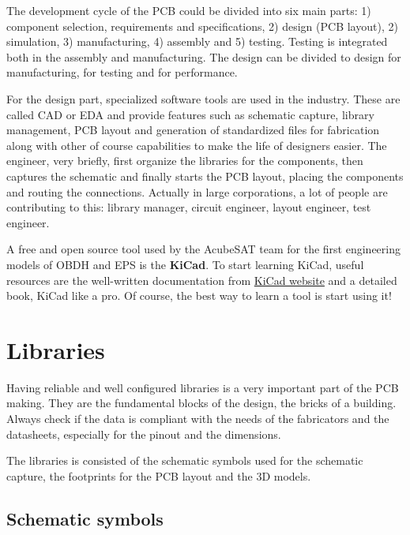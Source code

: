 \documentclass[final]{cubedoc}
\begin{document}
	The development cycle of the PCB could be divided into six main parts: 1) component selection, requirements and specifications, 2) design (PCB layout), 2) simulation, 3) manufacturing, 4) assembly and 5) testing. Testing is integrated both in the assembly and manufacturing.
	The design can be divided to design for manufacturing, for testing and for performance.  
	
	For the design part, specialized software tools are used in the industry. These are called CAD or EDA and provide features such as schematic capture, library management, PCB layout and generation of standardized files for fabrication along with other of course capabilities to make the life of designers easier. The engineer, very briefly, first organize the libraries for the components, then captures the schematic and finally starts the PCB layout, placing the components and routing the connections. Actually in large corporations, a lot of people are contributing to this: library manager, circuit engineer, layout engineer, test engineer.
	
	A free and open source tool used by the AcubeSAT team for the first engineering models of OBDH and EPS is the \textbf{KiCad}. To start learning KiCad, useful resources are the well-written documentation from \href{http://docs.kicad-pcb.org/}{KiCad website} and a detailed book, KiCad like a pro. Of course, the best way to learn a tool is start using it!
	
	\section{Libraries}
	
	Having reliable and well configured libraries is a very important part of the PCB making. They are the fundamental blocks of the design, the bricks of a building. Always check if the data is compliant with the needs of the fabricators and the datasheets, especially for the pinout and the dimensions.
	
	The libraries is consisted of the schematic symbols used for the schematic capture, the footprints for the PCB layout and the 3D models.
	
	\subsection{Schematic symbols}
	
\end{document}
